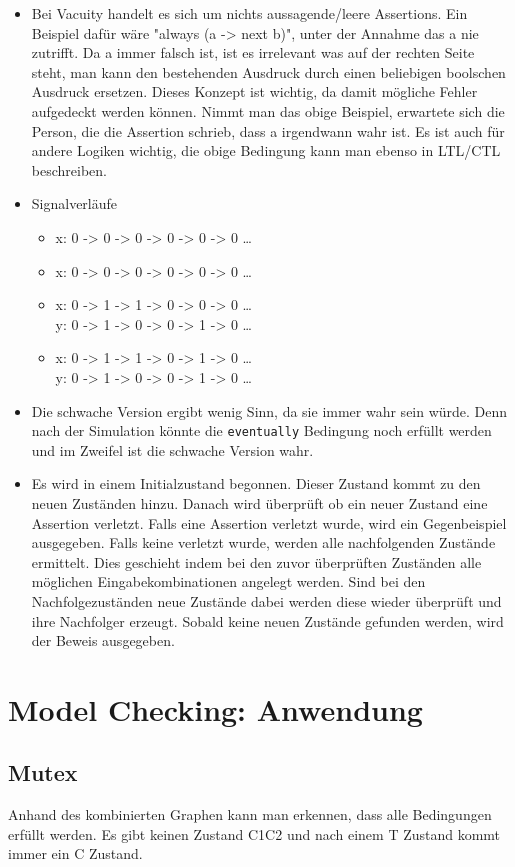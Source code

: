 \documentclass[12pt,a4paper]{article}
\begin{document}
\begin{itemize}
	\item Bei Vacuity handelt es sich um nichts aussagende/leere Assertions. Ein Beispiel dafür wäre "always (a -> next b)", unter der Annahme das a nie zutrifft. Da a immer falsch ist, ist es irrelevant was auf der rechten Seite steht, man kann den bestehenden Ausdruck durch einen beliebigen boolschen Ausdruck ersetzen.
Dieses Konzept ist wichtig, da damit mögliche Fehler aufgedeckt werden können. Nimmt man das obige Beispiel, erwartete sich die Person, die die Assertion schrieb, dass a irgendwann wahr ist.
Es ist auch für andere Logiken wichtig, die obige Bedingung kann man ebenso in LTL/CTL beschreiben.
  \item Signalverläufe
		\begin{itemize}
			\item x: 0 -> 0 -> 0 -> 0 -> 0 -> 0 …
			\item x: 0 -> 0 -> 0 -> 0 -> 0 -> 0 …
			\item x: 0 -> 1 -> 1 -> 0 -> 0 -> 0 … \\
						y: 0 -> 1 -> 0 -> 0 -> 1 -> 0 …
			\item x: 0 -> 1 -> 1 -> 0 -> 1 -> 0 … \\
						y: 0 -> 1 -> 0 -> 0 -> 1 -> 0 …
		\end{itemize}
	\item Die schwache Version ergibt wenig Sinn, da sie immer wahr sein würde. Denn nach der Simulation könnte die \texttt{eventually} Bedingung noch erfüllt werden und im Zweifel ist die schwache Version wahr.
	\item Es wird in einem Initialzustand begonnen. Dieser Zustand kommt zu den neuen Zuständen hinzu.
Danach wird überprüft ob ein neuer Zustand eine Assertion verletzt. Falls eine Assertion verletzt wurde, wird ein Gegenbeispiel ausgegeben. Falls keine verletzt wurde, werden alle nachfolgenden Zustände ermittelt. Dies geschieht indem bei den zuvor überprüften Zuständen alle möglichen Eingabekombinationen angelegt werden. Sind bei den Nachfolgezuständen neue Zustände dabei werden diese wieder überprüft und ihre Nachfolger erzeugt. Sobald keine neuen Zustände gefunden werden, wird der Beweis ausgegeben.
\end{itemize}

\section{Model Checking: Anwendung}

\subsection{Mutex}
Anhand des kombinierten Graphen kann man erkennen, dass alle Bedingungen erfüllt werden. Es gibt keinen Zustand C1C2 und nach einem T Zustand kommt immer ein C Zustand.
\end{document}
